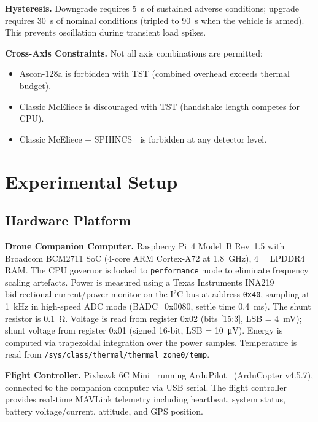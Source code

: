 \documentclass[conference]{IEEEtran}
\begin{document}
\textbf{Hysteresis.}
Downgrade requires \SI{5}{\second} of sustained adverse conditions; upgrade requires \SI{30}{\second} of nominal conditions (tripled to \SI{90}{\second} when the vehicle is armed).
This prevents oscillation during transient load spikes.

\textbf{Cross-Axis Constraints.}
Not all axis combinations are permitted:
\begin{itemize}[noitemsep]
    \item Ascon-128a is forbidden with TST (combined overhead exceeds thermal budget).
    \item Classic McEliece is discouraged with TST (handshake length competes for CPU).
    \item Classic McEliece + SPHINCS$^+$ is forbidden at any detector level.
\end{itemize}

\section{Experimental Setup}
\label{sec:setup}

\subsection{Hardware Platform}

\textbf{Drone Companion Computer.}
Raspberry Pi~4 Model~B Rev~1.5 with Broadcom BCM2711 SoC (4-core ARM Cortex-A72 at \SI{1.8}{\giga\hertz}), \SI{4}{\giga\byte} LPDDR4 RAM.
The CPU governor is locked to \texttt{performance} mode to eliminate frequency scaling artefacts.
Power is measured using a Texas Instruments INA219~\cite{ina219} bidirectional current/power monitor on the I$^2$C bus at address \texttt{0x40}, sampling at \SI{1}{\kilo\hertz} in high-speed ADC mode (BADC=0x0080, settle time \SI{0.4}{\milli\second}).
The shunt resistor is \SI{0.1}{\ohm}.
Voltage is read from register 0x02 (bits [15:3], LSB = \SI{4}{\milli\volt}); shunt voltage from register 0x01 (signed 16-bit, LSB = \SI{10}{\micro\volt}).
Energy is computed via trapezoidal integration over the power samples.
Temperature is read from \texttt{/sys/class/thermal/thermal\_zone0/temp}.

\textbf{Flight Controller.}
Pixhawk 6C Mini~\cite{pixhawk} running ArduPilot~\cite{ardupilot} (ArduCopter v4.5.7), connected to the companion computer via USB serial.
The flight controller provides real-time MAVLink telemetry including heartbeat, system status, battery voltage/current, attitude, and GPS position.
\end{document}
